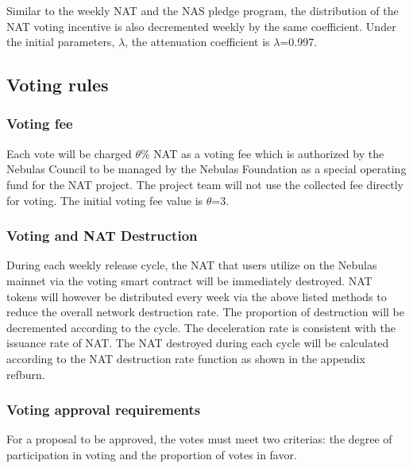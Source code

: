 Similar to the weekly NAT and the NAS pledge program, the distribution of the NAT voting incentive is also decremented weekly by the same coefficient. Under the initial parameters, $\lambda$, the attenuation coefficient is $\lambda$=0.997.

\subsection{Voting rules}

\subsubsection{Voting fee}

Each vote will be charged $\theta$\% NAT as a voting fee which is authorized by the Nebulas Council to be managed by the Nebulas Foundation as a special operating fund for the NAT project. The project team will not use the collected fee directly for voting. The initial voting fee value is $\theta$=3.

\subsubsection{Voting and NAT Destruction}

During each weekly release cycle, the NAT that users utilize on the Nebulas mainnet via the voting smart contract will be immediately destroyed. NAT tokens will however be distributed every week via the above listed methods to reduce the overall network destruction rate. The proportion of destruction will be decremented according to the cycle. The deceleration rate is consistent with the issuance rate of NAT. The NAT destroyed during each cycle will be calculated according to the NAT destruction rate function as shown in the appendix ref{burn}.

\subsubsection{Voting approval requirements}

For a proposal to be approved, the votes must meet two criterias: the degree of participation in voting and the proportion of votes in favor.

